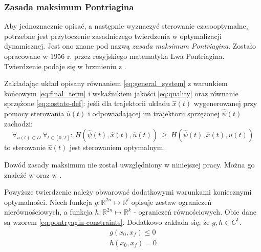 \subsubsection{Zasada maksimum Pontriagina}
\label{sub:toc-def-pontriagin}

Aby jednoznacznie opisać, a następnie wyznaczyć sterowanie czasooptymalne, potrzebne jest przytoczenie zasadniczego twierdzenia w optymalizacji dynamicznej. Jest ono znane pod nazwą \emph{zasada maksimum Pontriagina}. Zostało opracowane w 1956 r. przez rosyjskiego matematyka Lwa Pontriagina. Twierdzenie podaje się w brzmieniu z \cite{Korytowski2015}.

\begin{pontriagin-max}\label{the:pontryagin}
    Zakładając układ opisany równaniem \ref{eq:general_system} z warunkiem końcowym \ref{eq:final_term} i wskaźnikiem jakości \ref{eq:quality} oraz równanie sprzężone \ref{eq:costate-def}:
    jeśli dla trajektorii układu $\hat{x}(t)$ wygenerowanej przy pomocy sterowania $\hat{u}(t)$ i odpowiadającej im trajektorii sprzężonej $\hat{\psi}(t)$ zachodzi:
    \begin{equation}\label{eq:pontriagin}
    \forall_{u(t) \in D}~ \forall_{t \in [0, T]}:~ H(\hat{\psi}(t), \hat{x}(t), \hat{u}(t)) ~ \geq ~ H(\hat{\psi}(t), \hat{x}(t), u(t))
    \end{equation}
    to sterowanie $\hat{u}(t)$ jest sterowaniem optymalnym.
\end{pontriagin-max}

Dowód zasady maksimum nie został uwzględniony w niniejszej pracy. Można go znaleźć w \cite{Korytowski2015} oraz w \cite{Evans}.

Powyższe twierdzenie należy obwarować dodatkowymi warunkami koniecznymi optymalności. Niech funkcja $g: \mathbb{R}^{2n} \longmapsto \mathbb{R}^{l}$ opisuje zestaw ograniczeń nierównościowych, a funkcja $h: \mathbb{R}^{2n} \longmapsto \mathbb{R}^{k}$ - ograniczeń równościowych. Obie dane są wzorem \ref{eq:pontryagin-constraints}. Dodatkowo zakłada się, że $g, h \in C^{1}$.
\begin{equation}\label{eq:pontryagin-constraints}
    \begin{array}{lr}
    g(x_{0}, x_{f}) \leq 0 \\
    h(x_{0}, x_{f}) = 0
    \end{array}
\end{equation}

